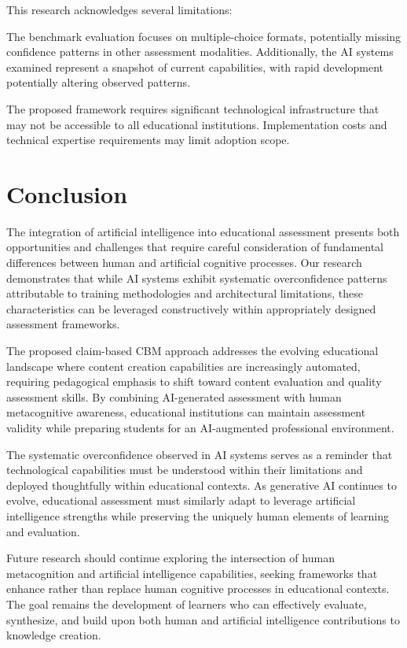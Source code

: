 \documentclass[sigconf]{acmart}
\begin{document}
This research acknowledges several limitations:

The benchmark evaluation focuses on multiple-choice formats, potentially missing confidence patterns in other assessment modalities. Additionally, the AI systems examined represent a snapshot of current capabilities, with rapid development potentially altering observed patterns.

The proposed framework requires significant technological infrastructure that may not be accessible to all educational institutions. Implementation costs and technical expertise requirements may limit adoption scope.

\section{Conclusion}

The integration of artificial intelligence into educational assessment presents both opportunities and challenges that require careful consideration of fundamental differences between human and artificial cognitive processes. Our research demonstrates that while AI systems exhibit systematic overconfidence patterns attributable to training methodologies and architectural limitations, these characteristics can be leveraged constructively within appropriately designed assessment frameworks.

The proposed claim-based CBM approach addresses the evolving educational landscape where content creation capabilities are increasingly automated, requiring pedagogical emphasis to shift toward content evaluation and quality assessment skills. By combining AI-generated assessment with human metacognitive awareness, educational institutions can maintain assessment validity while preparing students for an AI-augmented professional environment.

The systematic overconfidence observed in AI systems serves as a reminder that technological capabilities must be understood within their limitations and deployed thoughtfully within educational contexts. As generative AI continues to evolve, educational assessment must similarly adapt to leverage artificial intelligence strengths while preserving the uniquely human elements of learning and evaluation.

Future research should continue exploring the intersection of human metacognition and artificial intelligence capabilities, seeking frameworks that enhance rather than replace human cognitive processes in educational contexts. The goal remains the development of learners who can effectively evaluate, synthesize, and build upon both human and artificial intelligence contributions to knowledge creation.



\end{document}
